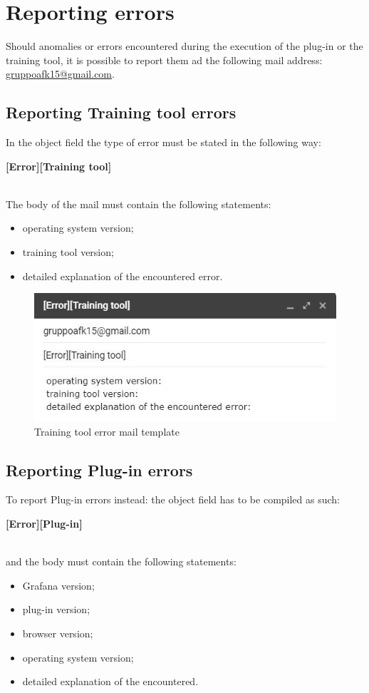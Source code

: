 \section{Reporting errors}
Should anomalies or errors encountered during the execution of the plug-in or the training tool, it is possible to report them ad the following mail address: \href{mailto:gruppoafk15@gmail.com}{gruppoafk15@gmail.com}.

\subsection{Reporting Training tool errors}
In the object field the type of error must be stated in the following way:\\ \centerline{\textbf{[Error][Training tool]}} \\
The body of the mail must contain the  following statements:

\begin{itemize}
	\item operating system version;
	\item training tool version;
	\item detailed explanation of the encountered error.
\end{itemize}

\begin{figure}[H]
\centering
\includegraphics[scale=0.85]{img/mail/tool_mail.jpg}
\caption{Training tool error mail template}
\end{figure}

\subsection{Reporting Plug-in errors}
To report Plug-in errors instead: the object field has to be compiled as such:\\ \centerline{\textbf{[Error][Plug-in]}} \\
and the body must contain the following statements:
\begin{itemize}
\item Grafana version;
\item plug-in version;
\item browser version;
\item operating system version;
\item  detailed explanation of the encountered.
\end{itemize}

